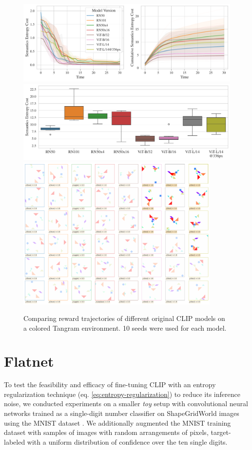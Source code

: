\begin{figure}[H]
    \centering    
    \includegraphics[width=\textwidth]{images/model_comparison_color.pdf}
    \includegraphics[width=\textwidth]{images/model_comparison_boxplot_color.pdf}
    \includegraphics[width=0.9\textwidth]{images/model_samples_color.pdf}
    \caption{Comparing reward trajectories of different original CLIP models on a colored Tangram environment. 10 seeds were used for each model.}    
\end{figure}


\chapter{Flatnet}
\label{sec:flatnet}
To test the feasibility and efficacy of fine-tuning CLIP with an entropy regularization technique (eq. \ref{eq:entropy-regularization}) to reduce its inference noise, we conducted experiments on a smaller \emph{toy} setup with convolutional neural networks trained as a single-digit number classifier on ShapeGridWorld images using the MNIST dataset \citep{mnist}.
We additionally augmented the MNIST training dataset with samples of images with random arrangements of pixels, target-labeled with a uniform distribution of confidence over the ten single digits.

